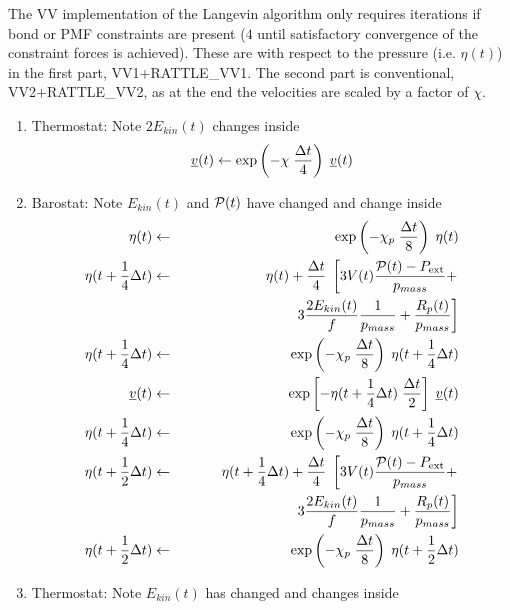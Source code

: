 The VV implementation of the Langevin algorithm only requires iterations
if bond or PMF constraints are present ($4$ until satisfactory
convergence of the constraint forces is achieved).  These are
with respect to the pressure (i.e. $\eta (t)$) in the first part,
VV1+RATTLE\_VV1.  The second part is conventional, VV2+RATTLE\_VV2,
as at the end the velocities are scaled by a factor of $\chi$.
\begin{enumerate}
\item Thermostat: Note $2 E_{kin}(t)$ changes inside
\begin{equation}
\mbox{$\underline{v}$}(t) \leftarrow \exp \left( -\chi \; {\Delta t \over 4} \right) \; \mbox{$\underline{v}$}(t)
\end{equation}
\item Barostat: Note $E_{kin}(t)$ and ${\cal P}(t)$ have changed and change inside
\begin{eqnarray}
\eta (t) &\leftarrow& \exp \left( -\chi_{p} \; {\Delta t \over 8} \right) \;
\eta (t)\nonumber \\
\eta (t + {1 \over 4} \Delta t) &\leftarrow& \eta (t) + {\Delta t \over 4} \;
\left[ 3 V(t) \frac{{\cal P}(t) - P_{\rm ext}}{p_{mass}} + \right. \nonumber \\
&& ~~~~~~~~~~~~~~~~~~~~~~~~\left. 3 \frac{2 E_{kin}(t)}{f} \frac{1}{p_{mass}} + \frac{R_{p}(t)}{p_{mass}} \right] \nonumber \\
\eta (t + {1 \over 4} \Delta t) &\leftarrow& \exp \left( -\chi_{p} \; {\Delta t \over 8} \right)  \;
\eta (t + {1 \over 4} \Delta t) \nonumber \\
\mbox{$\underline{v}$}(t) &\leftarrow& \exp \left[ -\eta (t + {1 \over 4} \Delta t) \;
{\Delta t \over 2} \right] \; \mbox{$\underline{v}$}(t) \\
\eta (t + {1 \over 4} \Delta t) &\leftarrow& \exp \left( -\chi_{p} \; {\Delta t \over 8} \right)  \;
\eta (t + {1 \over 4} \Delta t) \nonumber \\
\eta (t + {1 \over 2} \Delta t) &\leftarrow& \eta (t + {1 \over 4} \Delta t) + {\Delta t \over 4} \;
\left[ 3 V(t) \frac{{\cal P}(t) - P_{\rm ext}}{p_{mass}} + \right. \nonumber \\
&& ~~~~~~~~~~~~~~~~~~~~~~~~\left. 3 \frac{2 E_{kin}(t)}{f} \frac{1}{p_{mass}} + \frac{R_{p}(t)}{p_{mass}} \right] \nonumber \\
\eta (t + {1 \over 2} \Delta t) &\leftarrow& \exp \left( -\chi_{p} \; {\Delta t \over 8} \right)  \;
\eta (t + {1 \over 2} \Delta t) \nonumber
\end{eqnarray}
\item Thermostat: Note $E_{kin}(t)$ has changed and changes inside

\end{enumerate}
